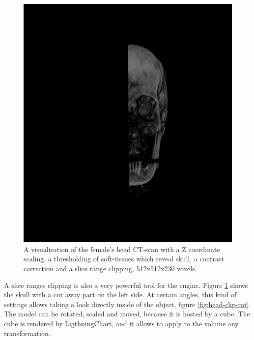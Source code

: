 \documentclass[twoside, english, 11pt]{report}
\begin{document}
\begin{figure}[H]
\centerline{\includegraphics[scale = 0.44]{img/head-clip}}
\caption{A visualisation of the female's head CT-scan with a Z coordinate scaling, a thresholding of soft-tissues which reveal skull, a contrast correction and a slice range clipping, 512x512x230 voxels.\label{fig:head-clip}}
\end{figure}

A slice ranges clipping is also a very powerful tool for the engine. Figure \ref{fig:head-clip} shows the skull with a cut away part on the left side. At certain angles, this kind of settings allows taking a look directly inside of the object, figure \ref{fig:head-clip-rot}. The model can be rotated, scaled and moved, because it is hosted by a cube. The cube is rendered by LigthningChart, and it allows to apply to the volume any transformation.\\
\end{document}

